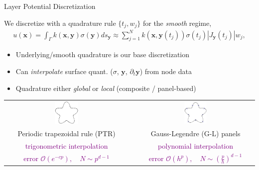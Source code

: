 \documentclass[t]{beamer}
\newcommand{\mbf}[1]{{\bm #1}}           %
\newcommand{\com}[1]{{\scriptsize \textcolor{purple}{#1}}}      %
\newcommand{\xx}{\mbf{x}}
\newcommand{\yy}{\mbf{y}}
\begin{document}
\begin{noframe}{Layer Potential Discretization}
  
  We discretize with a quadrature rule $\{t_j, w_j\}$ for the \emph{smooth} regime,
  \begin{align}
    u(\xx) = 
    \int_\Gamma k(\xx, \yy) \sigma(\yy) ds_\yy
    \approx
    \sum_{j=1}^N k\left(\xx, \yy(t_j)\right) \sigma(t_j) |J_\yy(t_j)| w_j, 
  \end{align}
  \begin{itemize}
  \item Underlying/smooth quadrature is our base discretization
  \item Can \emph{interpolate} surface quant. ($\sigma$, $\yy$, $\partial_t\yy$) from node data
  \item Quadrature either \emph{global} or \emph{local} (composite / panel-based)
  \end{itemize}
  \begin{center}
    \begin{tabular}{ccc}
      \includegraphics[width=0.2\textwidth]{fig/starfish_trapz} &
                                                                  \hspace{3em}
      &
        \includegraphics[width=0.2\textwidth]{fig/starfish_panels}\\
      Periodic trapezoidal rule (PTR) & & Gauss-Legendre (G-L) panels \\
      \com{trigonometric interpolation} & & \com{polynomial interpolation} \\
      \com{error $\mathcal O(e^{-cp}), \quad N\sim p^{d-1}$} &
      &
        \com{error $\mathcal O(h^p), \quad N \sim \left(\frac{p}{h}\right)^{d-1}$} \\                                            
    \end{tabular}
  \end{center}
\end{noframe}
  
\end{document}
